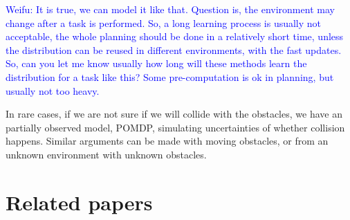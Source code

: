 \documentclass{article}
\begin{document}
\textcolor{blue}{Weifu: It is true, we can model it like that. Question is, the environment may change after a task is performed. So, a long learning process is usually not acceptable, the whole planning should be done in a relatively short time, unless the distribution can be reused in different environments, with the fast updates. So, can you let me know usually how long will these methods learn the distribution for a task like this? Some pre-computation is ok in planning, but usually not too heavy. }

In rare cases, if we are not sure if we will collide with the obstacles, we have an partially observed model, POMDP, simulating uncertainties of whether collision happens. Similar arguments can be made with moving obstacles, or from an unknown environment with unknown obstacles. 

\section{Related papers}
\end{document}
